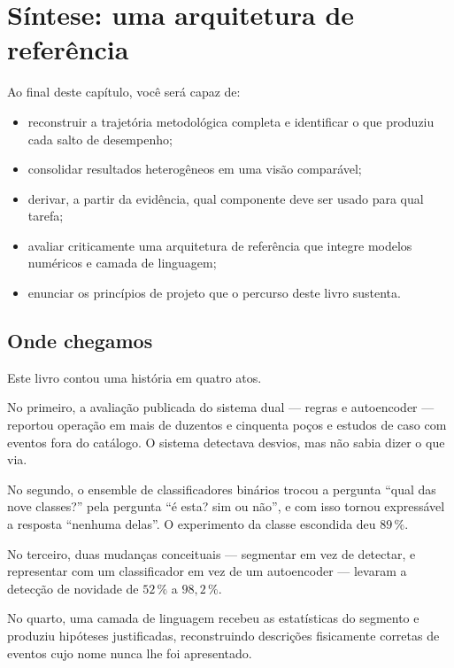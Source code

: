 \chapter{Síntese: uma arquitetura de referência}
\label{cap:sintese}

\begin{objetivos}
Ao final deste capítulo, você será capaz de:
\begin{itemize}[leftmargin=*,itemsep=0.2em]
  \item reconstruir a trajetória metodológica completa e identificar o que produziu cada
        salto de desempenho;
  \item consolidar resultados heterogêneos em uma visão comparável;
  \item derivar, a partir da evidência, qual componente deve ser usado para qual tarefa;
  \item avaliar criticamente uma arquitetura de referência que integre modelos numéricos
        e camada de linguagem;
  \item enunciar os princípios de projeto que o percurso deste livro sustenta.
\end{itemize}
\end{objetivos}

\section{Onde chegamos}

Este livro contou uma história em quatro atos.

No primeiro, a avaliação publicada do sistema dual --- regras e autoencoder --- reportou
operação em mais de duzentos e cinquenta poços e estudos de caso com eventos fora do
catálogo. O sistema detectava desvios, mas não sabia dizer o que via.

No segundo, o ensemble de classificadores binários trocou a pergunta ``qual das nove
classes?'' pela pergunta ``é esta? sim ou não'', e com isso tornou expressável a resposta
``nenhuma delas''. O experimento da classe escondida deu $89\,\%$.

No terceiro, duas mudanças conceituais --- segmentar em vez de detectar, e representar
com um classificador em vez de um autoencoder --- levaram a detecção de novidade de
$52\,\%$ a $98{,}2\,\%$.

No quarto, uma camada de linguagem recebeu as estatísticas do segmento e produziu
hipóteses justificadas, reconstruindo descrições fisicamente corretas de eventos cujo
nome nunca lhe foi apresentado.

